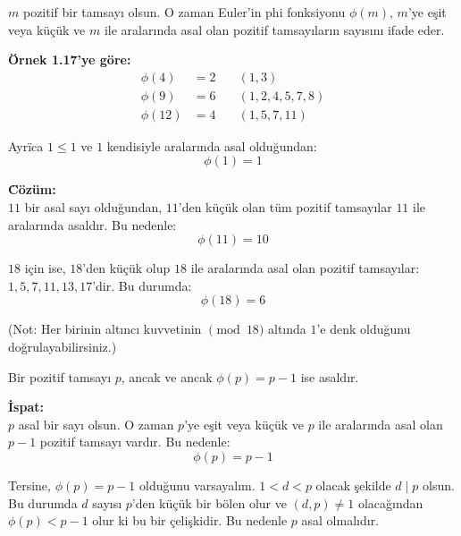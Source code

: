 \documentclass[12pt]{article}
\begin{document}
\begin{tcolorbox}[colback=blue!5, colframe=blue!40!black, title=Tanım, fonttitle=\bfseries, sharp corners, boxrule=0.6pt]
$m$ pozitif bir tamsayı olsun. O zaman Euler'in phi fonksiyonu $\phi(m)$, $m$'ye eşit veya küçük ve $m$ ile aralarında asal olan pozitif tamsayıların sayısını ifade eder.
\end{tcolorbox}

\vspace{1em}

\noindent \textbf{\"Ornek 1.17'ye g\"ore:}
\begin{align*}
\phi(4) &= 2 \quad & (1, 3) \\
\phi(9) &= 6 \quad & (1, 2, 4, 5, 7, 8) \\
\phi(12) &= 4 \quad & (1, 5, 7, 11)
\end{align*}

\vspace{1em}

\noindent Ayr\"ica $1 \leq 1$ ve $1$ kendisiyle aralarında asal olduğundan:
\[
\phi(1) = 1
\]

\vspace{2em}

\begin{tcolorbox}[colback=gray!10, colframe=black, title=\textbf{\"Ornek 1.18: $\phi(11)$ ve $\phi(18)$ Hesaplama}, fonttitle=\bfseries, sharp corners]
\textbf{\"C\"oz\"um:}\\
$11$ bir asal sayı olduğundan, $11$'den küçük olan t\"um pozitif tamsayılar $11$ ile aralarında asaldır. Bu nedenle:
\[
\phi(11) = 10
\]

$18$ için ise, $18$'den küçük olup $18$ ile aralarında asal olan pozitif tamsayılar: $1, 5, 7, 11, 13, 17$'dir. Bu durumda:
\[
\phi(18) = 6
\]

(Not: Her birinin altıncı kuvvetinin $\pmod{18}$ altında $1$'e denk olduğunu doğrulayabilirsiniz.)
\end{tcolorbox}

\vspace{2em}

\begin{tcolorbox}[colback=yellow!5, colframe=orange!50!black, title=\textbf{Lemma 1.5: Asal Sayılar ve $\phi$ Fonksiyonu}, fonttitle=\bfseries, sharp corners]
Bir pozitif tamsayı $p$, ancak ve ancak $\phi(p) = p - 1$ ise asaldır.

\textbf{İspat:}\\
$p$ asal bir sayı olsun. O zaman $p$'ye eşit veya küçük ve $p$ ile aralarında asal olan $p - 1$ pozitif tamsayı vardır. Bu nedenle:
\[
\phi(p) = p - 1
\]

Tersine, $\phi(p) = p - 1$ olduğunu varsayalım. $1 < d < p$ olacak şekilde $d \mid p$ olsun. Bu durumda $d$ sayısı $p$'den küçük bir bölen olur ve $(d, p) \ne 1$ olacağından $\phi(p) < p - 1$ olur ki bu bir çelişkidir. Bu nedenle $p$ asal olmalıdır.
\end{tcolorbox}
\end{document}
